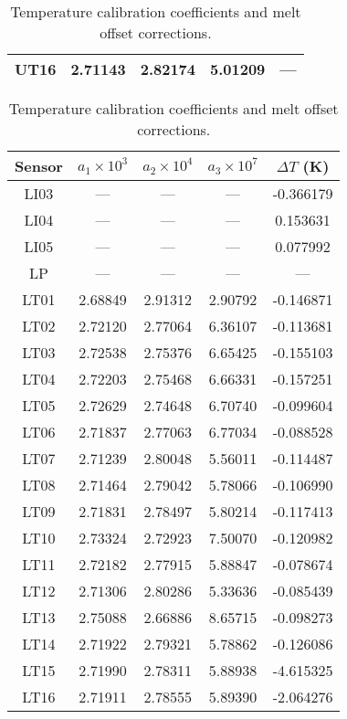 \documentclass[utf8]{article}
\begin{document}
\begin{table}
\begin{minipage}[b]{85mm}
\begin{tabular}{ccccc}
          UT16 & 2.71143 & 2.82174 & 5.01209 &     ---   \\
          \hline
        \end{tabular}
      \end{minipage}
      \begin{minipage}{85mm}
        \caption{%
          Temperature calibration coefficients and melt offset corrections.}
        \begin{tabular}{ccccc} \\
          \hline
          Sensor & $a_1\times10^{3}$ & $a_2\times10^{4}$
                 & $a_3\times10^{7}$ & $\Delta T$ (K) \\
          \hline
          LI03 &   ---   &   ---   &   ---   & -0.366179 \\
          LI04 &   ---   &   ---   &   ---   &  0.153631 \\
          LI05 &   ---   &   ---   &   ---   &  0.077992 \\
          LP   &   ---   &   ---   &   ---   &     ---   \\
          LT01 & 2.68849 & 2.91312 & 2.90792 & -0.146871 \\
          LT02 & 2.72120 & 2.77064 & 6.36107 & -0.113681 \\
          LT03 & 2.72538 & 2.75376 & 6.65425 & -0.155103 \\
          LT04 & 2.72203 & 2.75468 & 6.66331 & -0.157251 \\
          LT05 & 2.72629 & 2.74648 & 6.70740 & -0.099604 \\
          LT06 & 2.71837 & 2.77063 & 6.77034 & -0.088528 \\
          LT07 & 2.71239 & 2.80048 & 5.56011 & -0.114487 \\
          LT08 & 2.71464 & 2.79042 & 5.78066 & -0.106990 \\
          LT09 & 2.71831 & 2.78497 & 5.80214 & -0.117413 \\
          LT10 & 2.73324 & 2.72923 & 7.50070 & -0.120982 \\
          LT11 & 2.72182 & 2.77915 & 5.88847 & -0.078674 \\
          LT12 & 2.71306 & 2.80286 & 5.33636 & -0.085439 \\
          LT13 & 2.75088 & 2.66886 & 8.65715 & -0.098273 \\
          LT14 & 2.71922 & 2.79321 & 5.78862 & -0.126086 \\
          LT15 & 2.71990 & 2.78311 & 5.88938 & -4.615325 \\
          LT16 & 2.71911 & 2.78555 & 5.89390 & -2.064276 \\
          \hline
        \end{tabular}
      \end{minipage}
    \end{table}
\end{document}

